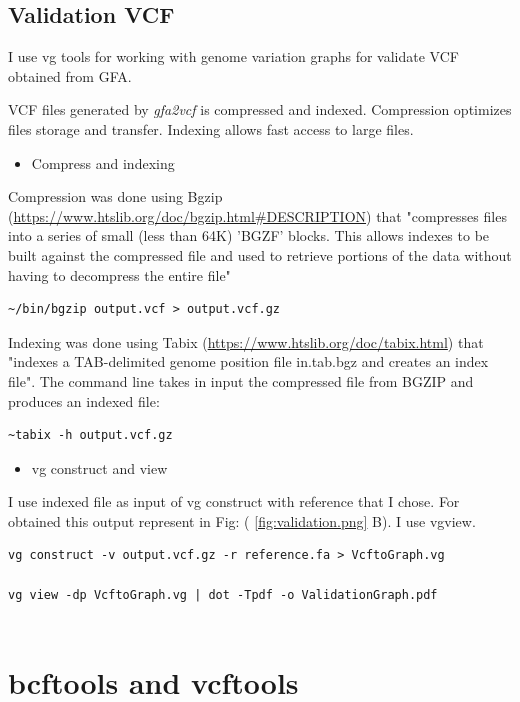 \subsection{Validation VCF}



I use vg tools for working with genome variation graphs for validate VCF obtained from GFA. 

VCF files generated by \textit{gfa2vcf} is compressed and indexed. Compression optimizes files storage and transfer. Indexing allows fast access to large files. 
\begin{itemize}
\item Compress and indexing
\end{itemize}

Compression was done using Bgzip (\url{https://www.htslib.org/doc/bgzip.html#DESCRIPTION}) that "compresses files into a series of small (less than 64K) 'BGZF' blocks. This allows indexes to be built against the compressed file and used to retrieve portions of the data without having to decompress the entire file"

\begin{verbatim}
~/bin/bgzip output.vcf > output.vcf.gz
\end{verbatim}

Indexing was done using Tabix (\url{https://www.htslib.org/doc/tabix.html}) that "indexes a TAB-delimited genome position file in.tab.bgz and creates an index file". 
The command line takes in input the compressed file from BGZIP and produces an indexed file: 

\begin{verbatim}
~tabix -h output.vcf.gz  
\end{verbatim}

\begin{itemize}
\item  vg construct and view
\end{itemize}
I use indexed file as input of vg construct with reference that I chose. For obtained this output represent in Fig: ( \ref{fig:validation.png} B). I use vgview.

\begin{verbatim}
vg construct -v output.vcf.gz -r reference.fa > VcftoGraph.vg

vg view -dp VcftoGraph.vg | dot -Tpdf -o ValidationGraph.pdf


\end{verbatim}

\section{bcftools and vcftools}

